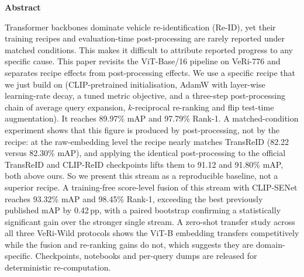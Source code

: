 \noindent\textbf{Abstract}\\[4pt]
{\small
Transformer backbones dominate vehicle re-identification (Re-ID), yet their
training recipes and evaluation-time post-processing are rarely reported under
matched conditions. This makes it difficult to attribute reported progress to
any specific cause. This paper revisits the ViT-Base/16 pipeline on VeRi-776
and separates recipe effects from post-processing effects. We use a specific recipe that we just build on
(CLIP-pretrained initialisation, AdamW with layer-wise learning-rate
decay, a tuned metric objective, and a three-step post-processing chain of
average query expansion, $k$-reciprocal re-ranking and flip test-time
augmentation). It reaches 89.97\% mAP and 97.79\% Rank-1. A matched-condition
experiment shows that this figure is produced by post-processing, not by
the recipe: at the raw-embedding level the recipe nearly matches TransReID
(82.22 versus 82.30\% mAP), and applying the identical post-processing to the
official TransReID and CLIP-ReID checkpoints lifts them to 91.12 and 91.80\%
mAP, both above ours. So we present this stream as a reproducible
baseline, not a superior recipe. A training-free score-level fusion of this
stream with CLIP-SENet reaches 93.32\% mAP and 98.45\% Rank-1, exceeding the
best previously published mAP by 0.42\,pp, with a paired bootstrap confirming a
statistically significant gain over the stronger single stream. A zero-shot
transfer study across all three VeRi-Wild protocols shows the ViT-B embedding
transfers competitively while the fusion and re-ranking gains do not,
which suggests they are domain-specific. Checkpoints, notebooks and per-query
dumps are released for deterministic re-computation.
\par}
